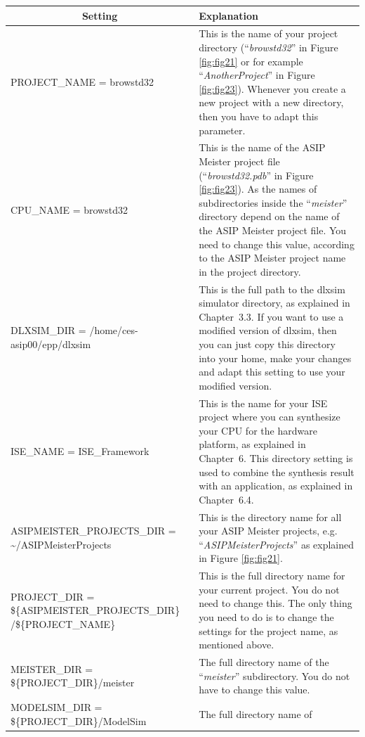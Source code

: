 \begin{table}[!htb]
	\centering
	\begin{tabular}{|p{6cm}|p{11cm}|}
		\hline
		\multicolumn{1}{|c|}{\textbf{Setting}} & \textbf{Explanation}                                                               \\ \hline
		PROJECT\_NAME = browstd32 & This is the name of your project directory
		(``\emph{browstd32}'' in Figure \ref{fig:fig21} or for
		example ``\emph{AnotherProject}'' in Figure \ref{fig:fig23}). Whenever you create a new project with a new directory, then you
		have to adapt this parameter.
		\\ \hline
		CPU\_NAME = browstd32 & This is the name of the ASIP Meister project
		file (``\emph{browstd32.pdb}'' in Figure \ref{fig:fig23}). As the names of subdirectories inside the ``\emph{meister}''
		directory depend on the name of the ASIP Meister project file. You need
		to change this value, according to the ASIP Meister project name in the
		project directory.
		\\ \hline
		DLXSIM\_DIR = /home/ces-asip00/epp/dlxsim & This is the full path to the
		dlxsim simulator directory, as explained in Chapter~3.3. If you want to
		use a modified version of dlxsim, then you can just copy this directory
		into your home, make your changes and adapt this setting to use your
		modified version.
		\\ \hline
		ISE\_NAME = ISE\_Framework & This is the name for your ISE project where
		you can synthesize your CPU for the hardware platform, as explained in
		Chapter~6. This directory setting is used to combine the synthesis
		result with an application, as explained in Chapter~6.4.
		\\ \hline
		ASIPMEISTER\_PROJECTS\_DIR =
				\textasciitilde/ASIPMeisterProjects & This is the directory name for
		all your ASIP Meister projects, e.g. ``\emph{ASIPMeisterProjects}'' as
		explained in Figure \ref{fig:fig21}.
		\\ \hline
		PROJECT\_DIR = \$\{ASIPMEISTER\_PROJECTS\_DIR\} /\$\{PROJECT\_NAME\} &
		This is the full directory name for your current project. You do not
		need to change this. The only thing you need to do is to change the
		settings for the project name, as mentioned above.
		\\ \hline
		MEISTER\_DIR = \$\{PROJECT\_DIR\}/meister & The full directory name of
		the ``\emph{meister}'' subdirectory. You do not have to change this
		value.
		\\ \hline
		MODELSIM\_DIR = \$\{PROJECT\_DIR\}/ModelSim & The full directory name of

\end{tabular}
\end{table}

